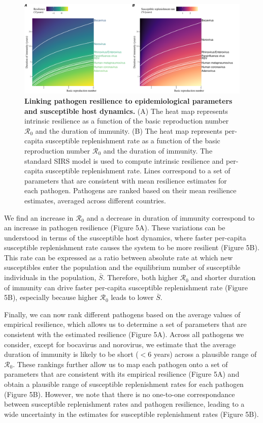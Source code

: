 \documentclass[12pt]{article}
\begin{document}
\begin{figure}[!th]
\begin{center}
\includegraphics[width=\textwidth]{../figure_summary/figure_summary.pdf}
\caption{
\textbf{Linking pathogen resilience to epidemiological parameters and susceptible host dynamics.}
(A) The heat map represents intrinsic resilience as a function of the basic reproduction number $\mathcal R_0$ and the duration of immunity.
(B) The heat map represents per-capita susceptible replenishment rate as a function of the basic reproduction number $\mathcal R_0$ and the duration of immunity.
The standard SIRS model is used to compute intrinsic resilience and per-capita susceptible replenishment rate.
Lines correspond to a set of parameters that are consistent with mean resilience estimates for each pathogen.
Pathogens are ranked based on their mean resilience estimates, averaged across different countries.
}
\end{center}
\end{figure}

We find an increase in $\mathcal R_0$ and a decrease in duration of immunity correspond to an increase in pathogen resilience (Figure 5A).
These variations can be understood in terms of the susceptible host dynamics, where faster per-capita susceptible replenishment rate causes the system to be more resilient (Figure 5B).
This rate can be expressed as a ratio between absolute rate at which new susceptibles enter the population and the equilibrium number of susceptible individuals in the population, $\bar{S}$.
Therefore, both higher $\mathcal R_0$ and shorter duration of immunity can drive faster per-capita susceptible replenishment rate (Figure 5B), especially because higher $\mathcal R_0$ leads to lower $\bar{S}$.

Finally, we can now rank different pathogens based on the average values of empirical resilience, which allows us to determine a set of parameters that are consistent with the estimated resilience (Figure 5A).
Across all pathogens we consider, except for bocavirus and norovirus, we estimate that the average duration of immunity is likely to be short ($<6$ years) across a plausible range of $\mathcal R_0$.
These rankings further allow us to map each pathogen onto a set of parameters that are consistent with its empirical resilience (Figure 5A) and obtain a plausible range of susceptible replenishment rates for each pathogen (Figure 5B).
However, we note that there is no one-to-one correspondance between susceptible replenishment rates and pathogen resilience, leading to a wide uncertainty in the estimates for susceptible replenishment rates (Figure 5B).
\end{document}
